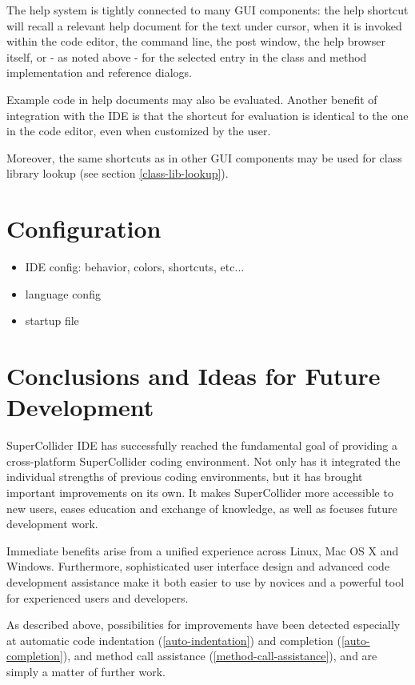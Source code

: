\documentclass[11pt,a4paper]{article}
\begin{document}
The help system is tightly connected to many GUI components: the help shortcut will recall a relevant help document
for the text under cursor, when it is invoked within the code editor, the command line, the post window, the help
browser itself, or - as noted above - for the selected entry in the class and method implementation and reference
dialogs.

Example code in help documents may also be evaluated. Another benefit of integration with the IDE is that the shortcut
for evaluation is identical to the one in the code editor, even when customized by the user.

Moreover, the same shortcuts as in other GUI components may be used for class library lookup (see section
\ref{class-lib-lookup}).

\section{Configuration}

\begin{itemize}
 \item IDE config: behavior, colors, shortcuts, etc...
 \item language config
 \item startup file
\end{itemize}

\section{Conclusions and Ideas for Future Development}

SuperCollider IDE has successfully reached the fundamental goal of providing a cross-platform SuperCollider coding
environment. Not only has it integrated the individual strengths of previous coding environments, but it has brought
important improvements on its own. It makes SuperCollider more accessible to new users, eases education and exchange of
knowledge, as well as focuses future development work.

Immediate benefits arise from a unified experience across Linux, Mac OS X and Windows. Furthermore, sophisticated user
interface design and advanced code development assistance make it both easier to use by novices and a powerful tool for
experienced users and developers.

As described above, possibilities for improvements have been detected especially at automatic code indentation
(\ref{auto-indentation}) and completion (\ref{auto-completion}), and method call assistance
(\ref{method-call-assistance}), and are simply a matter of further work.
\end{document}
